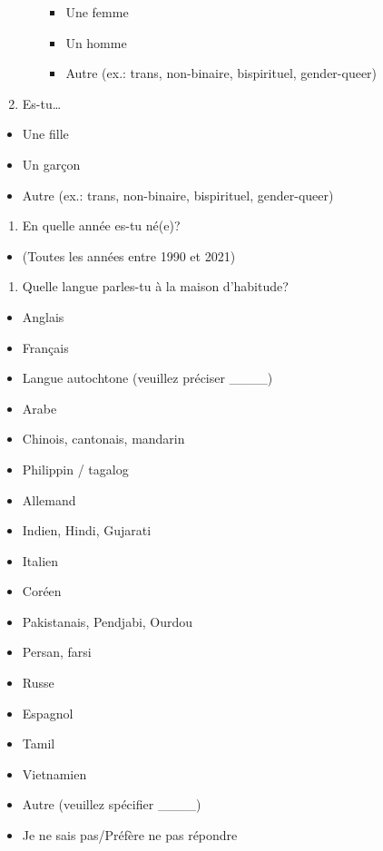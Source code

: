 \documentclass[
  letterpaper,
  DIV=11,
  numbers=noendperiod]{scrreprt}
\providecommand{\tightlist}{%
  \setlength{\itemsep}{0pt}\setlength{\parskip}{0pt}}\usepackage{longtable,booktabs,array}
\begin{document}
\begin{enumerate}
\begin{itemize}
    \begin{itemize}
    \tightlist
    \item
      Une femme
    \item
      Un homme
    \item
      Autre (ex.: trans, non-binaire, bispirituel, gender-queer)
    \end{itemize}
  \end{itemize}
\item
  Es-tu\ldots{}
\end{enumerate}

\begin{itemize}
\tightlist
\item
  Une fille
\item
  Un garçon
\item
  Autre (ex.: trans, non-binaire, bispirituel, gender-queer)
\end{itemize}

\begin{enumerate}
\def\labelenumi{\arabic{enumi}.}
\setcounter{enumi}{15}
\tightlist
\item
  En quelle année es-tu né(e)?
\end{enumerate}

\begin{itemize}
\tightlist
\item
  (Toutes les années entre 1990 et 2021)
\end{itemize}

\begin{enumerate}
\def\labelenumi{\arabic{enumi}.}
\setcounter{enumi}{16}
\tightlist
\item
  Quelle langue parles-tu à la maison d'habitude?
\end{enumerate}

\begin{itemize}
\tightlist
\item
  Anglais
\item
  Français
\item
  Langue autochtone (veuillez préciser \_\_\_\_)
\item
  Arabe
\item
  Chinois, cantonais, mandarin
\item
  Philippin / tagalog
\item
  Allemand
\item
  Indien, Hindi, Gujarati
\item
  Italien
\item
  Coréen
\item
  Pakistanais, Pendjabi, Ourdou
\item
  Persan, farsi
\item
  Russe
\item
  Espagnol
\item
  Tamil
\item
  Vietnamien
\item
  Autre (veuillez spécifier \_\_\_\_)
\item
  Je ne sais pas/Préfère ne pas répondre
\end{itemize}
\end{document}
